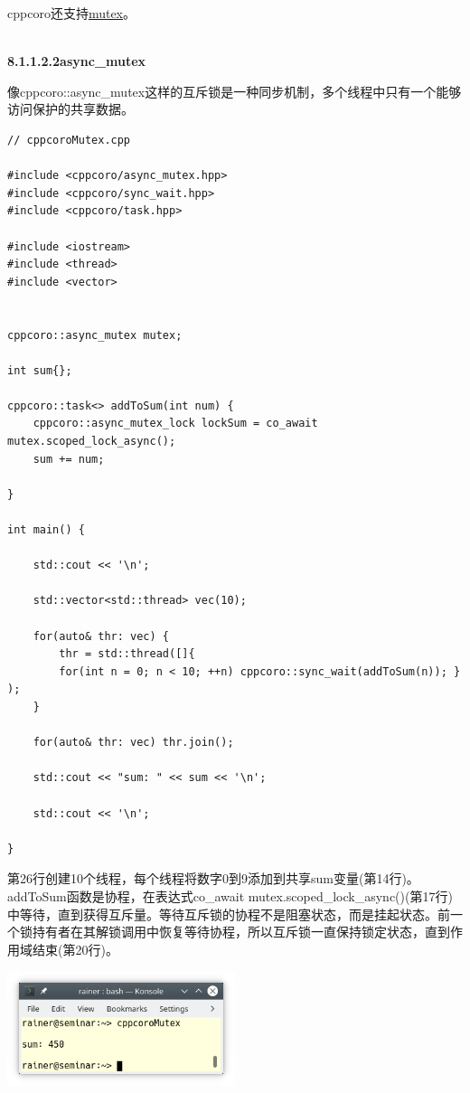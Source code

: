cppcoro还支持\href{https://en.cppreference.com/w/cpp/named_req/Mutex}{mutex}。

\hspace*{\fill} \\ %
\noindent
\textbf{8.1.1.2.2\hspace{0.2cm}async\_mutex}

像cppcoro::async\_mutex这样的互斥锁是一种同步机制，多个线程中只有一个能够访问保护的共享数据。

\begin{lstlisting}[style=styleCXX]
// cppcoroMutex.cpp

#include <cppcoro/async_mutex.hpp>
#include <cppcoro/sync_wait.hpp>
#include <cppcoro/task.hpp>

#include <iostream>
#include <thread>
#include <vector>


cppcoro::async_mutex mutex;

int sum{};

cppcoro::task<> addToSum(int num) {
	cppcoro::async_mutex_lock lockSum = co_await mutex.scoped_lock_async();
	sum += num;

}

int main() {

	std::cout << '\n';
	
	std::vector<std::thread> vec(10);
	
	for(auto& thr: vec) {
		thr = std::thread([]{
		for(int n = 0; n < 10; ++n) cppcoro::sync_wait(addToSum(n)); } );
	}
	
	for(auto& thr: vec) thr.join();
	
	std::cout << "sum: " << sum << '\n';
	
	std::cout << '\n';

}
\end{lstlisting}

第26行创建10个线程，每个线程将数字0到9添加到共享sum变量(第14行)。addToSum函数是协程，在表达式co\_await mutex.scoped\_lock\_async()(第17行)中等待，直到获得互斥量。等待互斥锁的协程不是阻塞状态，而是挂起状态。前一个锁持有者在其解锁调用中恢复等待协程，所以互斥锁一直保持锁定状态，直到作用域结束(第20行)。

\begin{center}
\includegraphics[width=0.5\textwidth]{content/5/chapter8/images/4.png}\\
\end{center}

